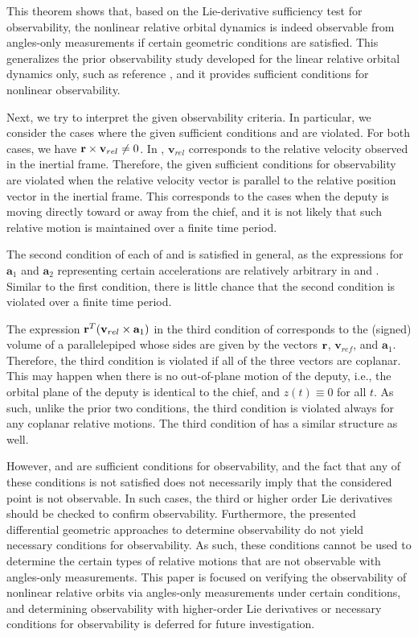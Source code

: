 This theorem shows that, based on the Lie-derivative sufficiency test for observability, the nonlinear relative orbital dynamics is indeed observable from angles-only measurements if certain geometric conditions are satisfied. This generalizes the prior observability study developed for the linear relative orbital dynamics only, such as reference \cite{WofGelITAES09}, and it provides sufficient conditions for nonlinear observability. 

Next, we try to interpret the given observability criteria. In particular, we consider the cases where the given sufficient conditions  and  are violated. For both cases, we have $\mathbf{r}\times\mathbf{v}_{rel}\neq 0$. In , $\mathbf{v}_{rel}$ corresponds to the relative velocity observed in the inertial frame. Therefore, the given sufficient conditions for observability are violated when the relative velocity vector is parallel to the relative position vector in the inertial frame. This corresponds to the cases when the deputy is moving directly toward or away from the chief, and it is not likely that such relative motion is maintained over a finite time period.

The second condition of each of  and  is satisfied in general, as the expressions for $\mathbf{a}_1$ and $\mathbf{a}_2$ representing certain accelerations are relatively arbitrary in  and . Similar to the first condition, there is little chance that the second condition is violated over a finite time period.

The expression $\mathbf{r}^T(\mathbf{v}_{rel}\times \mathbf{a}_1)$ in the third condition of  corresponds to the (signed) volume of a parallelepiped whose sides are given by the vectors $\mathbf{r}$, $\mathbf{v}_{ref}$, and $\mathbf{a}_1$. Therefore, the third condition is violated if all of the three vectors are coplanar. This may happen when there is no out-of-plane motion of the deputy, i.e., the orbital plane of the deputy is identical to the chief, and $z(t)\equiv 0$ for all $t$. As such, unlike the prior two conditions, the third condition is violated always for any coplanar relative motions. The third condition of  has a similar structure as well.

However,  and  are sufficient conditions for observability, and the fact that any of these conditions is not satisfied does not necessarily imply that the considered point is not observable. In such cases, the third or higher order Lie derivatives should be checked to confirm observability. Furthermore, the presented differential geometric approaches to determine observability do not yield necessary conditions for observability. As such, these conditions cannot be used to determine the certain types of relative motions that are not observable with angles-only measurements. This paper is focused on verifying the observability of nonlinear relative orbits via angles-only measurements under certain conditions, and determining observability with higher-order Lie derivatives or necessary conditions for observability is deferred for future investigation.


